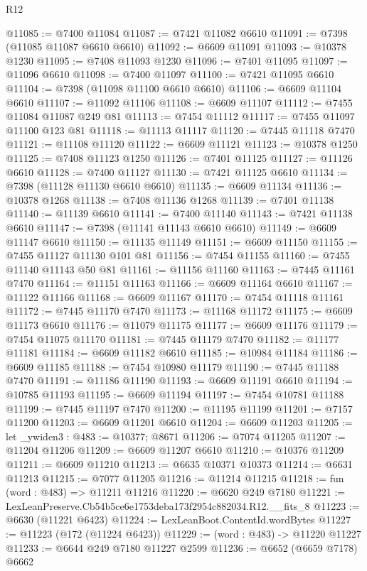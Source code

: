 \begin{lexlean}{R12}
\begin{coremodule}
@11085 := @7400 @11084
@11087 := @7421 @11082 @6610
@11091 := @7398 (@11085 @11087 @6610 @6610)
@11092 := @6609 @11091
@11093 := @10378 @1230
@11095 := @7408 @11093 @1230
@11096 := @7401 @11095
@11097 := @11096 @6610
@11098 := @7400 @11097
@11100 := @7421 @11095 @6610
@11104 := @7398 (@11098 @11100 @6610 @6610)
@11106 := @6609 @11104 @6610
@11107 := @11092 @11106
@11108 := @6609 @11107
@11112 := @7455 @11084 @11087 @249 @81
@11113 := @7454 @11112
@11117 := @7455 @11097 @11100 @123 @81
@11118 := @11113 @11117
@11120 := @7445 @11118 @7470
@11121 := @11108 @11120
@11122 := @6609 @11121
@11123 := @10378 @1250
@11125 := @7408 @11123 @1250
@11126 := @7401 @11125
@11127 := @11126 @6610
@11128 := @7400 @11127
@11130 := @7421 @11125 @6610
@11134 := @7398 (@11128 @11130 @6610 @6610)
@11135 := @6609 @11134
@11136 := @10378 @1268
@11138 := @7408 @11136 @1268
@11139 := @7401 @11138
@11140 := @11139 @6610
@11141 := @7400 @11140
@11143 := @7421 @11138 @6610
@11147 := @7398 (@11141 @11143 @6610 @6610)
@11149 := @6609 @11147 @6610
@11150 := @11135 @11149
@11151 := @6609 @11150
@11155 := @7455 @11127 @11130 @101 @81
@11156 := @7454 @11155
@11160 := @7455 @11140 @11143 @50 @81
@11161 := @11156 @11160
@11163 := @7445 @11161 @7470
@11164 := @11151 @11163
@11166 := @6609 @11164 @6610
@11167 := @11122 @11166
@11168 := @6609 @11167
@11170 := @7454 @11118 @11161
@11172 := @7445 @11170 @7470
@11173 := @11168 @11172
@11175 := @6609 @11173 @6610
@11176 := @11079 @11175
@11177 := @6609 @11176
@11179 := @7454 @11075 @11170
@11181 := @7445 @11179 @7470
@11182 := @11177 @11181
@11184 := @6609 @11182 @6610
@11185 := @10984 @11184
@11186 := @6609 @11185
@11188 := @7454 @10980 @11179
@11190 := @7445 @11188 @7470
@11191 := @11186 @11190
@11193 := @6609 @11191 @6610
@11194 := @10785 @11193
@11195 := @6609 @11194
@11197 := @7454 @10781 @11188
@11199 := @7445 @11197 @7470
@11200 := @11195 @11199
@11201 := @7157 @11200
@11203 := @6609 @11201 @6610
@11204 := @6609 @11203
@11205 := let _ywiden3 : @483 := @10377; @8671
@11206 := @7074 @11205
@11207 := @11204 @11206
@11209 := @6609 @11207 @6610
@11210 := @10376 @11209
@11211 := @6609 @11210
@11213 := @6635 @10371 @10373
@11214 := @6631 @11213
@11215 := @7077 @11205
@11216 := @11214 @11215
@11218 := fun (word : @483) => @11211 @11216
@11220 := @6620 @249 @7180
@11221 := LexLeanPreserve.Cb54b5ce6e1753deba173f2954c882034.R12.__fits_8
@11223 := @6630 (@11221 @6423)
@11224 := LexLeanBoot.ContentId.wordBytes
@11227 := @11223 (@172 (@11224 @6423))
@11229 := (word : @483) -> @11220 @11227
@11233 := @6644 @249 @7180 @11227 @2599
@11236 := @6652 (@6659 @7178) @6662

\end{coremodule}
\end{lexlean}
